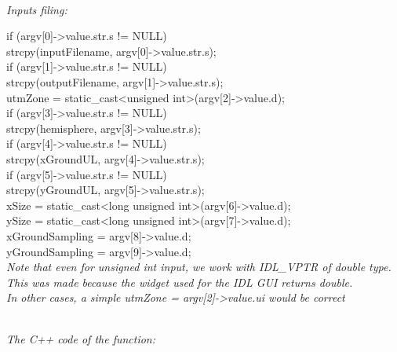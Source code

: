 \\
\indent \emph{Inputs filing:}\\
\begin{scriptsize}
\indent if (argv[0]->value.str.s != NULL)\\
\indent strcpy(inputFilename, argv[0]->value.str.s);\\
\indent if (argv[1]->value.str.s != NULL)\\
\indent strcpy(outputFilename, argv[1]->value.str.s);\\
\indent utmZone = static\_cast<unsigned int>(argv[2]->value.d);\\
\indent if (argv[3]->value.str.s != NULL)\\
\indent strcpy(hemisphere, argv[3]->value.str.s);\\
\indent if (argv[4]->value.str.s != NULL)\\
\indent strcpy(xGroundUL, argv[4]->value.str.s);\\
\indent if (argv[5]->value.str.s != NULL)\\
\indent strcpy(yGroundUL, argv[5]->value.str.s);\\
\indent xSize = static\_cast<long unsigned int>(argv[6]->value.d);\\
\indent ySize = static\_cast<long unsigned int>(argv[7]->value.d);\\
\indent xGroundSampling = argv[8]->value.d;\\
\indent yGroundSampling = argv[9]->value.d;\\
\indent \emph{Note that even for unsigned int input, we work with IDL\_VPTR of double type. \\\indent This was made because the widget used for the IDL GUI returns double.\\\indent In other cases, a simple utmZone = argv[2]->value.ui would be correct}\\
\end{scriptsize}
\\
\indent \emph{The C++ code of the function:}\\
